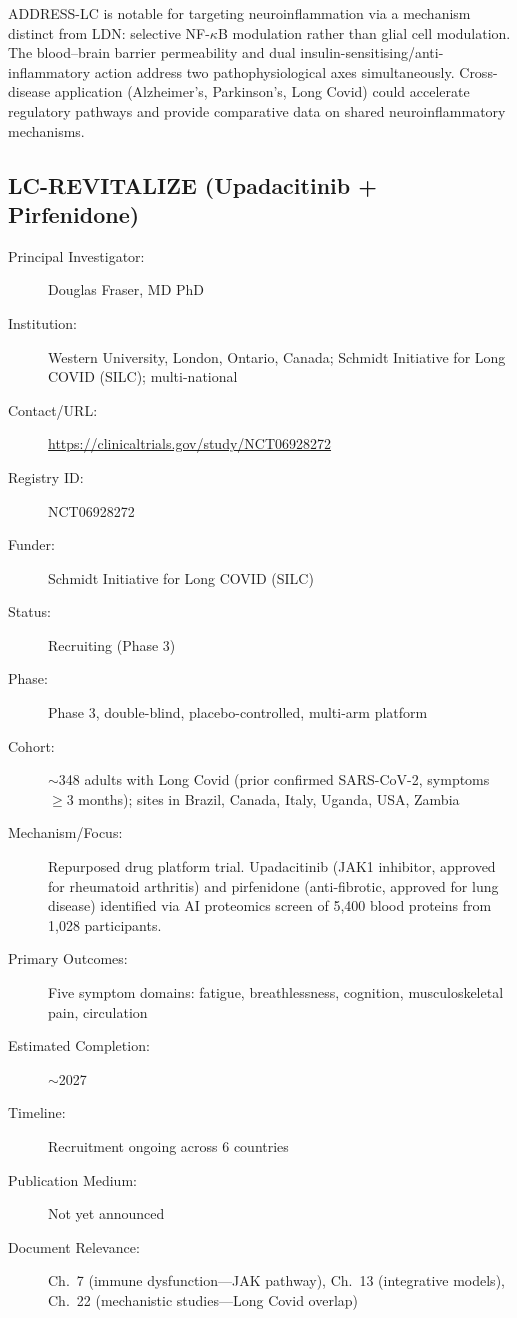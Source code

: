 ADDRESS-LC is notable for targeting neuroinflammation via a mechanism
distinct from LDN: selective NF-$\kappa$B modulation rather than glial
cell modulation.  The blood--brain barrier permeability and dual
insulin-sensitising/anti-inflammatory action address two pathophysiological
axes simultaneously.  Cross-disease application (Alzheimer's, Parkinson's,
Long Covid) could accelerate regulatory pathways and provide comparative
data on shared neuroinflammatory mechanisms.

\subsection{LC-REVITALIZE (Upadacitinib + Pirfenidone)}
\label{sec:registry-lc-revitalize}

\begin{description}
    \item[Principal Investigator:] Douglas Fraser, MD PhD
    \item[Institution:] Western University, London, Ontario, Canada;
        Schmidt Initiative for Long COVID (SILC); multi-national
    \item[Contact/URL:] \url{https://clinicaltrials.gov/study/NCT06928272}
    \item[Registry ID:] NCT06928272
    \item[Funder:] Schmidt Initiative for Long COVID (SILC)
    \item[Status:] Recruiting (Phase 3)
    \item[Phase:] Phase 3, double-blind, placebo-controlled, multi-arm
        platform
    \item[Cohort:] $\sim$348 adults with Long Covid (prior confirmed
        SARS-CoV-2, symptoms $\geq$3 months); sites in Brazil, Canada,
        Italy, Uganda, USA, Zambia
    \item[Mechanism/Focus:] Repurposed drug platform trial.  Upadacitinib
        (JAK1 inhibitor, approved for rheumatoid arthritis) and pirfenidone
        (anti-fibrotic, approved for lung disease) identified via AI
        proteomics screen of 5,400 blood proteins from 1,028 participants.
    \item[Primary Outcomes:] Five symptom domains: fatigue, breathlessness,
        cognition, musculoskeletal pain, circulation
    \item[Estimated Completion:] $\sim$2027
    \item[Timeline:] Recruitment ongoing across 6 countries
    \item[Publication Medium:] Not yet announced
    \item[Document Relevance:] Ch.~7 (immune dysfunction---JAK pathway),
        Ch.~13 (integrative models),
        Ch.~22 (mechanistic studies---Long Covid overlap)
\end{description}

